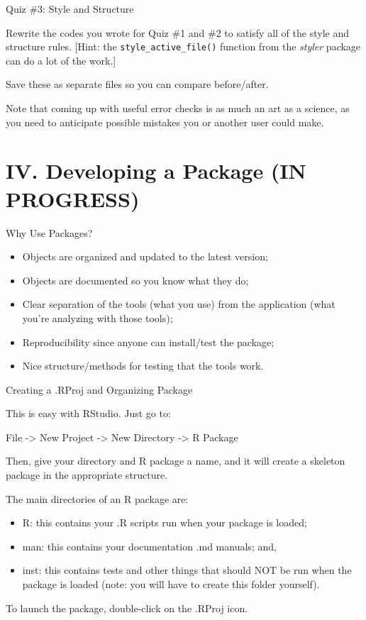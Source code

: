\documentclass[10pt,ignorenonframetext,]{beamer}
\providecommand{\tightlist}{%
\setlength{\itemsep}{0pt}\setlength{\parskip}{0pt}}
\begin{document}
\begin{frame}[fragile]{Quiz \#3: Style and Structure}

Rewrite the codes you wrote for Quiz \#1 and \#2 to satisfy all of the
style and structure rules. {[}Hint: the \texttt{style\_active\_file()}
function from the \emph{styler} package can do a lot of the work.{]}

Save these as separate files so you can compare before/after.

Note that coming up with useful error checks is as much an art as a
science, as you need to anticipate possible mistakes you or another user
could make.

\end{frame}

\section{IV. Developing a Package (IN
PROGRESS)}\label{iv.-developing-a-package-in-progress}

\begin{frame}{Why Use Packages?}

\begin{itemize}
\item
  Objects are organized and updated to the latest version;
\item
  Objects are documented so you know what they do;
\item
  Clear separation of the tools (what you use) from the application
  (what you're analyzing with those tools);
\item
  Reproducibility since anyone can install/test the package;
\item
  Nice structure/methods for testing that the tools work.
\end{itemize}

\end{frame}

\begin{frame}{Creating a .RProj and Organizing Package}

This is easy with RStudio. Just go to:

File -\textgreater{} New Project -\textgreater{} New Directory
-\textgreater{} R Package

Then, give your directory and R package a name, and it will create a
skeleton package in the appropriate structure.

The main directories of an R package are:

\begin{itemize}
\tightlist
\item
  R: this contains your .R scripts run when your package is loaded;
\item
  man: this contains your documentation .md manuals; and,
\item
  inst: this contains tests and other things that should NOT be run when
  the package is loaded (note: you will have to create this folder
  yourself).
\end{itemize}

To launch the package, double-click on the .RProj icon.

\end{frame}
\end{document}
